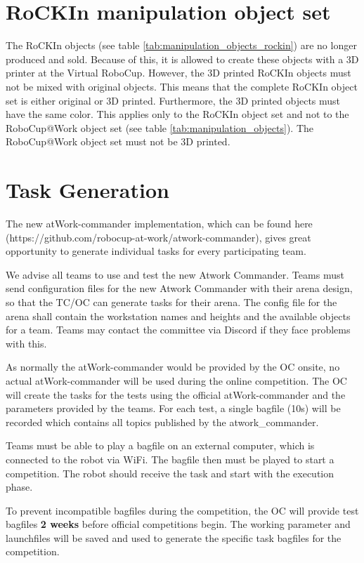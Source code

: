 \section{RoCKIn manipulation object set} 
\label{sec:VRCRoCKInSet}
The RoCKIn objects (see table \ref{tab:manipulation_objects_rockin}) are no longer produced and sold. Because of this, it is allowed to create these objects with a 3D printer at the Virtual RoboCup. However, the 3D printed RoCKIn objects must not be mixed with original objects. This means that the complete RoCKIn object set is either original or 3D printed. Furthermore, the 3D printed objects must have the same color. This applies only to the RoCKIn object set and not to the RoboCup@Work object set (see table \ref{tab:manipulation_objects}). The RoboCup@Work object set must not be 3D printed.


\section{Task Generation} 
\label{sec:VRCTaskGen}

The new atWork-commander implementation, which can be found here (https://github.com/robocup-at-work/atwork-commander), 
gives great opportunity to generate individual tasks for every participating team.

We advise all teams to use and test the new Atwork Commander. Teams must send configuration files for the new Atwork Commander with their arena design, so that the TC/OC can generate tasks for their arena. The config file for the arena shall contain the workstation names and heights and the available objects for a team. Teams may contact the committee via Discord if they face problems with this.  

As normally the atWork-commander would be provided by the OC onsite, no actual atWork-commander will be used during the online competition.
The OC will create the tasks for the tests using the official atWork-commander and the parameters provided by the teams. 
For each test, a single bagfile (10s) will be recorded which contains all topics published by the atwork\_commander.

Teams must be able to play a bagfile on an external computer, which is connected to the robot via WiFi.
The bagfile then must be played to start a competition. The robot should receive the task and start with the execution phase.

To prevent incompatible bagfiles during the competition, 
the OC will provide test bagfiles \textbf{2 weeks} before official competitions begin.
The working parameter and launchfiles will be saved and used to generate the specific task bagfiles for the competition.

